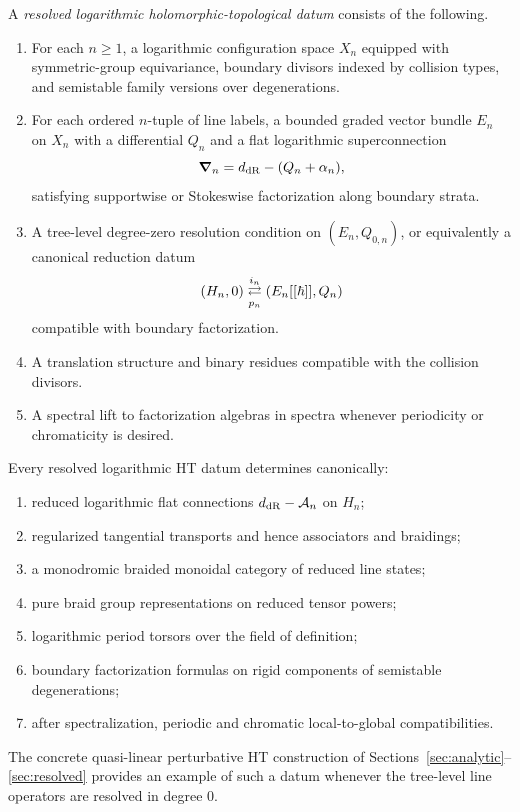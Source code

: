 \begin{definition}%
A \emph{resolved logarithmic holomorphic-topological datum} consists of the following.
\begin{enumerate}[label=\textup{(\roman*)}]
 \item For each $n\ge 1$, a logarithmic configuration space $X_n$ equipped with symmetric-group equivariance, boundary divisors indexed by collision types, and semistable family versions over degenerations.
 \item For each ordered $n$-tuple of line labels, a bounded graded vector bundle $E_n$ on $X_n$ with a differential $Q_n$ and a flat logarithmic superconnection
 \[
 \boldsymbol{\nabla}_n = d_{\mathrm{dR}}-(Q_n+\alpha_n),
 \]
 satisfying supportwise or Stokeswise factorization along boundary strata.
 \item A tree-level degree-zero resolution condition on $(E_n,Q_{0,n})$, or equivalently a canonical reduction datum
 \[
 (H_n,0) \underset{p_n}{\stackrel{i_n}{\rightleftarrows}} (E_n[[\hbar]],Q_n)
 \]
 compatible with boundary factorization.
 \item A translation structure and binary residues compatible with the collision divisors.
 \item A spectral lift to factorization algebras in spectra whenever periodicity or chromaticity is desired.
\end{enumerate}
\end{definition}

\begin{theorem}%
Every resolved logarithmic HT datum determines canonically:
\begin{enumerate}[label=\textup{(\roman*)}]
 \item reduced logarithmic flat connections $d_{\mathrm{dR}}-\mathcal A_n$ on $H_n$;
 \item regularized tangential transports and hence associators and braidings;
 \item a monodromic braided monoidal category of reduced line states;
 \item pure braid group representations on reduced tensor powers;
 \item logarithmic period torsors over the field of definition;
 \item boundary factorization formulas on rigid components of semistable degenerations;
 \item after spectralization, periodic and chromatic local-to-global compatibilities.
\end{enumerate}
The concrete quasi-linear perturbative HT construction of Sections~\ref{sec:analytic}--\ref{sec:resolved} provides an example of such a datum whenever the tree-level line operators are resolved in degree $0$.
\end{theorem}

